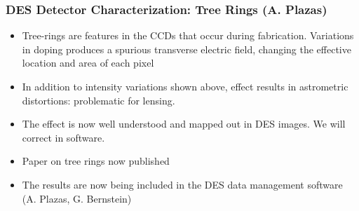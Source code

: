 \documentclass{beamer}
\begin{document}
\frame
{

    \frametitle{DES Detector Characterization: Tree Rings (A. Plazas)}

    \begin{itemize}
        \item

            Tree-rings are features in the CCDs that occur during fabrication.
            Variations in doping produces a spurious transverse electric field,
            changing the effective location and area of each pixel

        \item In addition to intensity variations shown above, effect results
            in astrometric distortions:  problematic for lensing.

        \item The effect is now well understood and mapped out in DES images.
            We will correct in software.

        \item Paper on tree rings now published

        \item The results are now being included in the DES data
            management software (A. Plazas, G. Bernstein)

    \end{itemize}
}
\end{document}
